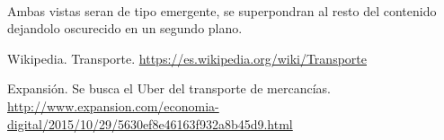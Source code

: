 \documentclass[10pt, a4paper,spanish]{article}
\begin{document}
			\paragraph{}
			Ambas vistas seran de tipo emergente, se superpondran al resto del contenido dejandolo oscurecido en un segundo plano.
	\begin{thebibliography}{9}

		Wikipedia. Transporte. \url{https://es.wikipedia.org/wiki/Transporte}

		Expansión. Se busca el Uber del transporte de mercancías. \url{http://www.expansion.com/economia-digital/2015/10/29/5630ef8e46163f932a8b45d9.html}

	\end{thebibliography}
\end{document}
